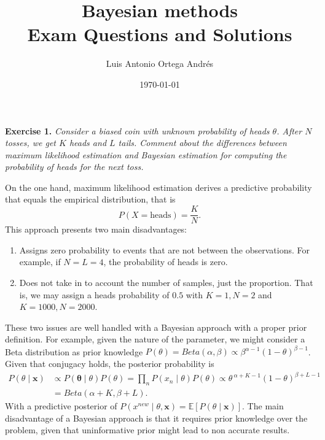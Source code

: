 \documentclass[11pt]{article}
\author{Luis Antonio Ortega Andrés}
\date{\today}
\title{Bayesian methods \\ \large Exam Questions and Solutions}
\theoremstyle{definition}
\begin{document}
\maketitle

\textbf{Exercise 1. }\emph{Consider a biased coin with unknown probability of heads \( \theta \). After \( N \)  tosses, we get \( K \)  heads and \( L \)  tails. Comment about the differences between maximum likelihood estimation and Bayesian estimation for computing the probability of heads for the next toss.}

On the one hand, maximum likelihood estimation derives a predictive probability that equals the empirical distribution, that is 
\[
     P( X = \text{heads}) = \frac{K}{N}.
\]
This approach presents two main disadvantages:
\begin{enumerate}
    \item Assigns zero probability to events that are not between the observations. For example, if \( N = L = 4 \), the probability of heads is zero.
    \item Does not take in to account the number of samples, just the proportion. That is, we may assign a heads probability of \( 0.5 \) with \( K = 1, N = 2 \) and \( K = 1000, N = 2000\).  
\end{enumerate}

These two issues are well handled with a Bayesian approach with a proper prior definition. For example, given the nature of the parameter, we might consider a Beta distribution as prior knowledge \( P(\theta) = Beta(\alpha, \beta) \propto \beta^{\alpha - 1}(1 - \theta)^{\beta - 1} \). Given that conjugacy holds, the posterior probability is
\[
    \begin{aligned}
    P(\theta \mid \bm{x}) &\propto P(\bm{\theta} \mid \theta)P(\theta) = \prod_n P(x_n \mid \theta)P(\theta) \propto \theta^{\ \alpha + K - 1}(1-\theta)^{\beta + L - 1} \\
    &= Beta(\alpha + K, \beta + L).
    \end{aligned}
\]
With a predictive posterior of \( P(x^{new} \mid \theta, \bm{x}) = \mathbb{E}[P(\theta \mid \bm{x})]\). The main disadvantage of a Bayesian approach is that it requires prior knowledge over the problem, given that uninformative prior might lead to non accurate results.  
\end{document}
